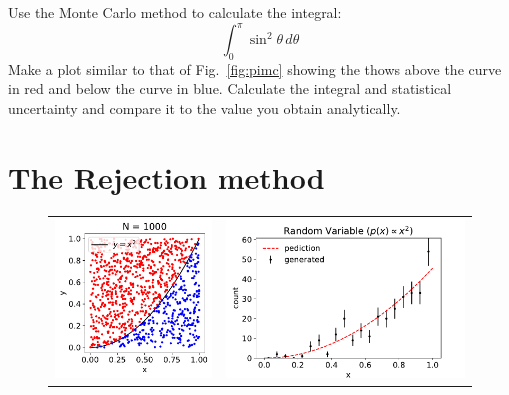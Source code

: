 \begin{plot} \end{plot}
Use the Monte Carlo method to calculate the integral:
\begin{displaymath}
  \int_0^\pi \sin^2 \theta \, d\theta
\end{displaymath}
Make a plot similar to that of Fig.~\ref{fig:pimc} showing the thows
above the curve in red and below the curve in blue.  Calculate the
integral and statistical uncertainty and compare it to the value you obtain analytically.

\section{The Rejection method}

\begin{figure}[htbp]
\begin{center}
  \begin{tabular}{cc}
  \includegraphics[height=0.30\textheight]{figs/labs/monte_carlo/rejectmc.pdf} &
  \includegraphics[height=0.30\textheight]{figs/labs/monte_carlo/quadhist.pdf} \\

\end{tabular}
\end{center}
\end{figure}
